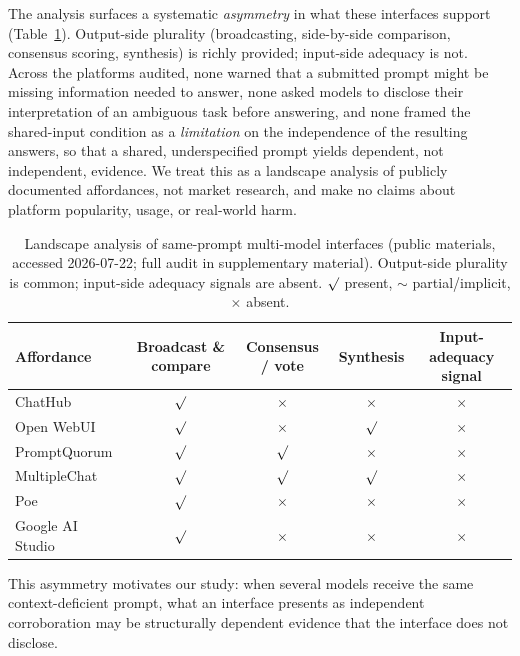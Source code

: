 \documentclass[acmsmall,screen,nonacm]{acmart}
\providecommand{\checkmark}{\ensuremath{\surd}}
\begin{document}
The analysis surfaces a systematic \emph{asymmetry} in what these interfaces support (Table~\ref{tab:audit}).
Output-side plurality (broadcasting, side-by-side comparison, consensus scoring, synthesis) is richly
provided; input-side adequacy is not. Across the platforms audited, none warned that a submitted prompt might
be missing information needed to answer, none asked models to disclose their interpretation of an ambiguous
task before answering, and none framed the shared-input condition as a \emph{limitation} on the independence
of the resulting answers, so that a
shared, underspecified prompt yields dependent, not independent, evidence. We treat this as a landscape
analysis of publicly documented affordances, not market research, and make no claims about platform
popularity, usage, or real-world harm.

\begin{table}[t]
\centering
\small
\caption{Landscape analysis of same-prompt multi-model interfaces (public materials, accessed 2026-07-22;
full audit in supplementary material). Output-side plurality is common; input-side adequacy signals are
absent. $\checkmark$ present, $\sim$ partial/implicit, $\times$ absent.}
\label{tab:audit}
\begin{tabular}{@{}lcccc@{}}
\toprule
Affordance & Broadcast \& compare & Consensus / vote & Synthesis & Input-adequacy signal \\
\midrule
ChatHub~\cite{chathub2026}                       & $\checkmark$ & $\times$ & $\times$ & $\times$ \\
Open WebUI~\cite{openwebui2026multimodel}        & $\checkmark$ & $\times$ & $\checkmark$ & $\times$ \\
PromptQuorum~\cite{promptquorum2026home}         & $\checkmark$ & $\checkmark$ & $\times$ & $\times$ \\
MultipleChat~\cite{multiplechat2026}             & $\checkmark$ & $\checkmark$ & $\checkmark$ & $\times$ \\
Poe~\cite{poe2024multibot}                       & $\checkmark$ & $\times$ & $\times$ & $\times$ \\
Google AI Studio~\cite{googleaistudio2024compare}& $\checkmark$ & $\times$ & $\times$ & $\times$ \\
\bottomrule
\end{tabular}
\end{table}

This asymmetry motivates our study: when several models receive the same context-deficient prompt, what an
interface presents as independent corroboration may be structurally dependent evidence that the interface
does not disclose.
\end{document}
